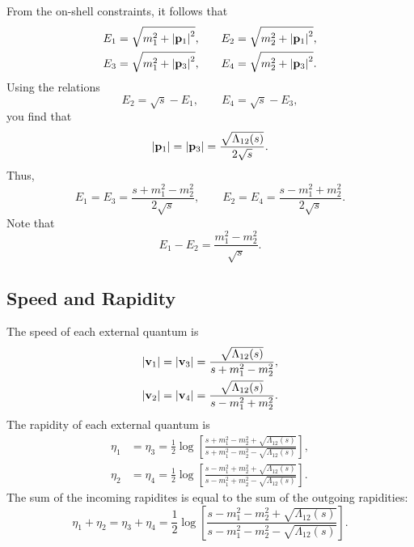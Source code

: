 From the on-shell constraints, it follows that
\begin{equation}
\begin{split}
	E_{1} = \sqrt{m_{1}^{2} + \left\lvert \mathbf{p}_{1} \right\rvert^{2}}, &\qquad E_{2} = \sqrt{m_{2}^{2} + \left\lvert \mathbf{p}_{1} \right\rvert^{2}}, \\
	E_{3} = \sqrt{m_{1}^{2} + \left\lvert \mathbf{p}_{3} \right\rvert^{2}}, &\qquad E_{4} = \sqrt{m_{2}^{2} + \left\lvert \mathbf{p}_{3} \right\rvert^{2}}.
\end{split}
\end{equation}
Using the relations
\begin{equation}
	E_{2} = \sqrt{s} - E_{1}, \qquad E_{4} = \sqrt{s} - E_{3},
\end{equation}
you find that
\begin{equation}
	\left\lvert \mathbf{p}_{1} \right\rvert = \left\lvert \mathbf{p}_{3} \right\rvert = \frac{\sqrt{\Lambda_{12}(s)}}{2 \sqrt{s}}.
\end{equation}
Thus,
\begin{equation}
	E_{1} = E_{3} = \frac{s + m_{1}^{2} - m_{2}^{2}}{2 \sqrt{s}}, \qquad E_{2} = E_{4} = \frac{s - m_{1}^{2} + m_{2}^{2}}{2 \sqrt{s}}.
\end{equation}
Note that
\begin{equation}
	E_{1} - E_{2} = \frac{m_{1}^{2} - m_{2}^{2}}{\sqrt{s}}.
\end{equation}
\subsection{Speed and Rapidity}
The speed of each external quantum is
\begin{align}
	\left\lvert \mathbf{v}_{1} \right\rvert &= \left\lvert \mathbf{v}_{3} \right\rvert = \frac{\sqrt{\Lambda_{12}(s)}}{s + m_{1}^{2} - m_{2}^{2}}, \\
	\left\lvert \mathbf{v}_{2} \right\rvert &= \left\lvert \mathbf{v}_{4} \right\rvert = \frac{\sqrt{\Lambda_{12}(s)}}{s - m_{1}^{2} + m_{2}^{2}}.
\end{align}
The rapidity of each external quantum is
\begin{align}
	\eta_{1} &= \eta_{3} = \frac{1}{2} \log{\left[\frac{s + m_{1}^{2} - m_{2}^{2} + \sqrt{\Lambda_{12}(s)}}{s + m_{1}^{2} - m_{2}^{2} - \sqrt{\Lambda_{12}(s)}}\right]}, \\
	\eta_{2} &= \eta_{4} = \frac{1}{2} \log{\left[\frac{s - m_{1}^{2} + m_{2}^{2} + \sqrt{\Lambda_{12}(s)}}{s - m_{1}^{2} + m_{2}^{2} - \sqrt{\Lambda_{12}(s)}}\right]}.
\end{align}
The sum of the incoming rapidites is equal to the sum of the outgoing rapidities:
\begin{equation}
	\eta_{1} + \eta_{2} = \eta_{3} + \eta_{4} = \frac{1}{2} \log{\left[ \frac{s - m_{1}^{2} - m_{2}^{2} + \sqrt{\Lambda_{12}(s)}}{s - m_{1}^{2} - m_{2}^{2} - \sqrt{\Lambda_{12}(s)}} \right]}.
\end{equation}
